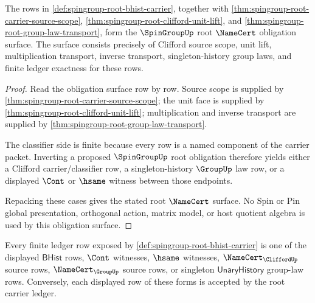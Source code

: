 \begin{theorem}
\label{thm:spingroup-root-namecert-obligation-surface}
The rows in \autoref{def:spingroup-root-bhist-carrier}, together with \autoref{thm:spingroup-root-carrier-source-scope}, \autoref{thm:spingroup-root-clifford-unit-lift}, and \autoref{thm:spingroup-root-group-law-transport}, form the $\SpinGroupUp$ root $\NameCert$ obligation surface. The surface consists precisely of Clifford source scope, unit lift, multiplication transport, inverse transport, singleton-history group laws, and finite ledger exactness for these rows.
\end{theorem}
\begin{proof}
Read the obligation surface row by row. Source scope is supplied by \autoref{thm:spingroup-root-carrier-source-scope}; the unit face is supplied by \autoref{thm:spingroup-root-clifford-unit-lift}; multiplication and inverse transport are supplied by \autoref{thm:spingroup-root-group-law-transport}.

The classifier side is finite because every row is a named component of the carrier packet. Inverting a proposed $\SpinGroupUp$ root obligation therefore yields either a Clifford carrier/classifier row, a singleton-history $\GroupUp$ law row, or a displayed $\Cont$ or $\hsame$ witness between those endpoints.

Repacking these cases gives the stated root $\NameCert$ surface. No Spin or Pin global presentation, orthogonal action, matrix model, or host quotient algebra is used by this obligation surface.
\end{proof}
\begin{theorem}
\label{thm:spingroup-root-ledger-exhaustion}
Every finite ledger row exposed by \autoref{def:spingroup-root-bhist-carrier} is one of the displayed $\mathsf{BHist}$ rows, $\Cont$ witnesses, $\hsame$ witnesses, $\NameCert_{\CliffordUp}$ source rows, $\NameCert_{\GroupUp}$ source rows, or singleton $\mathsf{UnaryHistory}$ group-law rows. Conversely, each displayed row of these forms is accepted by the root carrier ledger.
\end{theorem}

